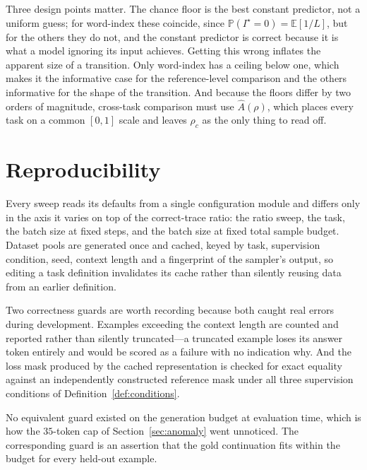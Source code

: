 \documentclass{article}
\theoremstyle{plain}
\theoremstyle{definition}
\theoremstyle{remark}
\newcommand{\E}{\mathbb{E}}
\newcommand{\Prob}{\mathbb{P}}
\newcommand{\1}{\mathbf{1}}
\begin{document}
Three design points matter. The chance floor is the best constant predictor, not
a uniform guess; for word-index these coincide, since
$\Prob(I^\star = 0) = \E[1/L]$, but for the others they do not, and the constant
predictor is correct because it is what a model ignoring its input achieves.
Getting this wrong inflates the apparent size of a transition. Only word-index
has a ceiling below one, which makes it the informative case for the
reference-level comparison and the others informative for the shape of the
transition. And because the floors differ by two orders of magnitude, cross-task
comparison must use $\widehat A(\rho)$, which places every task on a common
$[0,1]$ scale and leaves $\rho_c$ as the only thing to read off.

\section{Reproducibility}
\label{app:repro}

Every sweep reads its defaults from a single configuration module and differs
only in the axis it varies on top of the correct-trace ratio: the ratio sweep,
the task, the batch size at fixed steps, and the batch size at fixed total sample
budget. Dataset pools are generated once and cached, keyed by task, supervision
condition, seed, context length and a fingerprint of the sampler's output, so
editing a task definition invalidates its cache rather than silently reusing data
from an earlier definition.

Two correctness guards are worth recording because both caught real errors during
development. Examples exceeding the context length are counted and reported
rather than silently truncated---a truncated example loses its answer token
entirely and would be scored as a failure with no indication why. And the loss
mask produced by the cached representation is checked for exact equality against
an independently constructed reference mask under all three supervision
conditions of Definition~\ref{def:conditions}.

No equivalent guard existed on the generation budget at evaluation time, which is
how the $35$-token cap of Section~\ref{sec:anomaly} went unnoticed. The
corresponding guard is an assertion that the gold continuation fits within the
budget for every held-out example.
\end{document}
